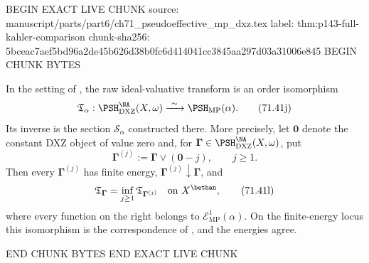 BEGIN EXACT LIVE CHUNK
source: manuscript/parts/part6/ch71_pseudoeffective_mp_dxz.tex
label: thm:p143-full-kahler-comparison
chunk-sha256: 5bceac7aef5bd96a2de45b626d38b0fc6d414041cc3845aa297d03a31006e845
BEGIN CHUNK BYTES
\begin{theorem}
\label{thm:p143-full-kahler-comparison}
In the setting of , the raw
ideal-valuative transform is an order isomorphism
\[
 \mathfrak T_\alpha:
 \PSH^{\NA}_{\mathrm{DXZ}}(X,\omega)
 \xrightarrow{\ \sim\ }
 \PSH_{\mathrm{MP}}(\alpha).
\tag{71.41j}\label{eq:p143-full-kahler-comparison}
\]
Its inverse is the section \(\mathcal S_\alpha\) constructed there.
More precisely, let \(\mathbf 0\) denote the constant DXZ object of value
zero and, for \(\boldsymbol\Gamma\in
\PSH^{\NA}_{\mathrm{DXZ}}(X,\omega)\), put
\[
 \boldsymbol\Gamma^{(j)}
 :=\boldsymbol\Gamma\vee(\mathbf 0-j),
 \qquad j\geq1.
\tag{71.41k}\label{eq:p143-dxz-truncation}
\]
Then every \(\boldsymbol\Gamma^{(j)}\) has finite energy,
\(\boldsymbol\Gamma^{(j)}\downarrow\boldsymbol\Gamma\), and
\[
 \mathfrak T_{\boldsymbol\Gamma}
 =\inf_{j\geq1}\mathfrak T_{\boldsymbol\Gamma^{(j)}}
 \quad\text{on }X^{\bethan},
\tag{71.41l}\label{eq:p143-raw-truncation-limit}
\]
where every function on the right belongs to
\(\mathcal E^1_{\mathrm{MP}}(\alpha)\).  On the finite-energy locus this
isomorphism is the correspondence of
, and the energies agree.
\end{theorem}
END CHUNK BYTES
END EXACT LIVE CHUNK

